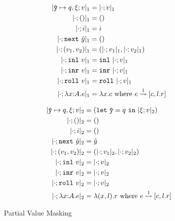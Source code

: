 %

\begin{figure*}
\centering
\begin{minipage}[]{10em}
\begin{align*}
\masko {\yhat \mapsto q,\xi;v}			&= \masko{\cdot;v} \\
\masko {\cdot;()}			&= () \\
\masko {\cdot;i}			&= i \\
\masko {\cdot;\next~\hat y}	&= () \\
\masko {\cdot;(v_1,v_2)}	&= (\masko {\cdot;v_1},\masko {\cdot;v_2}) \\
\masko {\cdot;\inl~v}		&= \inl~\masko{\cdot;v} \\
\masko {\cdot;\inr~v}		&= \inr~\masko{\cdot;v} \\
\masko {\cdot;\roll~v}		&= \roll~\masko{\cdot;v} \\
\masko {\cdot;\lam xAe}		&= \lambda x.c \text{ where } \splitone e A {c,l.r}
\end{align*}
\end{minipage}
\qquad\qquad
\begin{minipage}[]{10em}
\begin{align*}
\maskt {\yhat \mapsto q,\xi;v}			&= (\letin \yhat q {\maskt{\xi;v}}) \\
\maskt {\cdot;()}			&= () \\
\maskt {\cdot;i}			&= () \\
\maskt {\cdot;\next~\hat y}	&= \hat y \\
\maskt {\cdot;(v_1,v_2)}	&= (\maskt {\cdot;v_1},\maskt {\cdot;v_2}) \\
\maskt {\cdot;\inl~v}		&= \maskt {\cdot;v} \\
\maskt {\cdot;\inr~v}		&= \maskt {\cdot;v} \\
\maskt {\cdot;\roll~v}		&= \maskt {\cdot;v} \\
\maskt {\cdot;\lam xAe}		&= \lambda (x,l).r \text{ where } \splitone e A {c,l.r}
\end{align*}
\end{minipage}
\caption{Partial Value Masking}
\label{fig:valMask}
\end{figure*}

